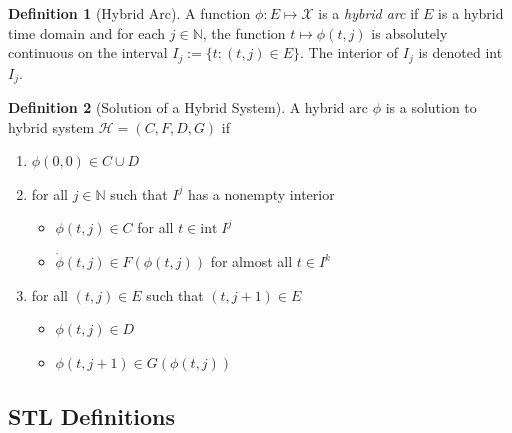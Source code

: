 \documentclass{article}
\theoremstyle{definition}
\newtheorem{definition}{Definition}[section]
\begin{document}
\begin{definition}[Hybrid Arc]

    A function $\phi: E\mapsto \mathcal{X}$ is a \textit{hybrid arc} if
    $E$ is a hybrid time domain and for each $j\in\mathbb{N}$, the function
    $t\mapsto\phi(t,j)$ is absolutely continuous on the interval $I_j :=
    \{t:(t,j)\in E\}$. The interior of $I_j$ is denoted int $I_j$.
\end{definition}

\begin{definition}[Solution of a Hybrid System]
    A hybrid arc $\phi$ is a solution to hybrid system $\mathcal{H}=(C,F,D,G)$ if
    \begin{enumerate}
        \item $\phi(0,0) \in C\cup D$
        \item for all $j \in \mathbb{N}$ such that $I^j$ has a nonempty
           interior 
            \begin{itemize}[noitemsep,nolistsep]
                \item $\phi(t,j) \in C$ for all $t \in
                    \mathrm{int}\;I^j$
                \item $\dot{\phi}(t,j)\in F(\phi(t,j))$ for almost
                    all $t \in I^k$
            \end{itemize}
        \item for all $(t,j)\in E $ such that $(t,j+1)\in E$  
            \begin{itemize}[noitemsep,nolistsep]
                \item $\phi(t,j) \in D$
                \item $\phi(t,j+1) \in G(\phi(t,j))$
            \end{itemize}
    \end{enumerate}
\end{definition}



\subsection{STL Definitions} 

\end{document}
